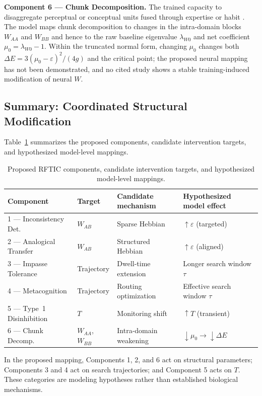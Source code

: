 \documentclass[a4paper,twocolumn,10pt]{article}
\newcommand{\eps}{\varepsilon}
\newcommand{\dE}{\Delta E}
\begin{document}
\textbf{Component 6 --- Chunk Decomposition.}
The trained capacity to disaggregate perceptual or conceptual units fused through expertise or
habit \citep{knoblich1999constraint}. The model maps chunk decomposition to changes in the intra-domain blocks
$W_{AA}$ and $W_{BB}$ and hence to the raw baseline eigenvalue $\lambda_{W0}$ and net coefficient
$\mu_0=\lambda_{W0}-1$. Within the truncated normal form, changing $\mu_0$ changes both
$\dE=3(\mu_0-\eps)^2/(4g)$ and the critical point; the proposed neural mapping has not been
demonstrated, and no cited study shows a stable training-induced modification of neural $W$.

\subsection{Summary: Coordinated Structural Modification}

Table~\ref{tab:components} summarizes the proposed components, candidate intervention targets, and
hypothesized model-level mappings.

\begin{table}[htbp]
\centering
\caption{Proposed RFTIC components, candidate intervention targets, and hypothesized model-level mappings.}
\label{tab:components}
\small
\begin{tabular}{@{}llll@{}}
\toprule
\textbf{Component} & \textbf{Target} & \textbf{Candidate mechanism} & \textbf{Hypothesized model effect} \\
\midrule
1 --- Inconsistency Det. & $W_{AB}$ & Sparse Hebbian & $\uparrow \eps$ (targeted) \\
2 --- Analogical Transfer & $W_{AB}$ & Structured Hebbian & $\uparrow \eps$ (aligned) \\
3 --- Impasse Tolerance & Trajectory & Dwell-time extension & Longer search window $\tau$ \\
4 --- Metacognition & Trajectory & Routing optimization & Effective search window $\tau$ \\
5 --- Type~1 Disinhibition & $T$ & Monitoring shift & $\uparrow T$ (transient) \\
6 --- Chunk Decomp. & $W_{AA}$, $W_{BB}$ & Intra-domain weakening & $\downarrow \mu_0 \to \downarrow \dE$ \\
\bottomrule
\end{tabular}
\end{table}

In the proposed mapping, Components 1, 2, and 6 act on structural parameters; Components 3 and 4
act on search trajectories; and Component 5 acts on $T$. These categories are modeling hypotheses
rather than established biological mechanisms.
\end{document}
